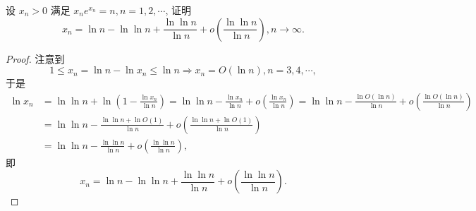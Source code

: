 \documentclass[../../main.tex]{subfiles}
\begin{document}
\begin{proposition}\label{proposition:Lampert W 的渐进估计}
设 $x_n > 0$ 满足 $x_n e^{x_n} = n, n = 1, 2, \cdots$, 证明
\[
x_n = \ln n - \ln \ln n + \frac{\ln \ln n}{\ln n} + o\left( \frac{\ln \ln n}{\ln n} \right), n \to \infty.
\]
\end{proposition}
\begin{proof}
注意到
\[
1 \leqslant x_n = \ln n - \ln x_n \leqslant \ln n \Rightarrow x_n = O(\ln n), n = 3, 4, \cdots,
\]
于是
\[
\begin{aligned}
\ln x_n &= \ln \ln n + \ln \left( 1 - \frac{\ln x_n}{\ln n} \right) = \ln \ln n - \frac{\ln x_n}{\ln n} + o\left( \frac{\ln x_n}{\ln n} \right) = \ln \ln n - \frac{\ln O(\ln n)}{\ln n} + o\left( \frac{\ln O(\ln n)}{\ln n} \right) \\
&= \ln \ln n - \frac{\ln \ln n + \ln O(1)}{\ln n} + o\left( \frac{\ln \ln n + \ln O(1)}{\ln n} \right) \\
&= \ln \ln n - \frac{\ln \ln n}{\ln n} + o\left( \frac{\ln \ln n}{\ln n} \right),
\end{aligned}
\]
即
\[
x_n = \ln n - \ln \ln n + \frac{\ln \ln n}{\ln n} + o\left( \frac{\ln \ln n}{\ln n} \right).
\]
\end{proof}
\end{document}
